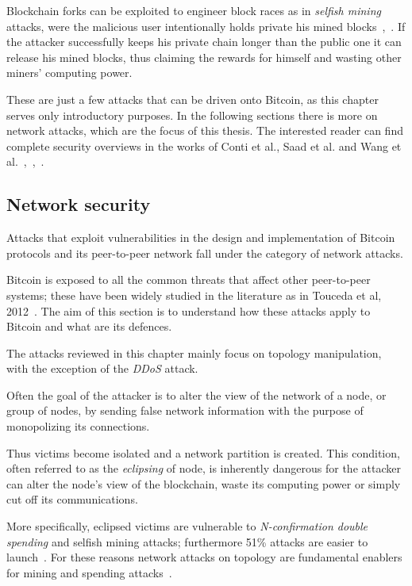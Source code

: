 \documentclass[12pt, letterpaper, twoside]{article}
\begin{document}
Blockchain forks can be exploited to engineer block races as in \textit{selfish mining} attacks, were the malicious user intentionally holds private his mined blocks~\cite{selfishmining},~\cite{leelavimolsilp2018selfish}. If the attacker successfully keeps his private chain longer than the public one it can release his mined blocks, thus claiming the rewards for himself and wasting other miners' computing power.

These are just a few attacks that can be driven onto Bitcoin, as this chapter serves only introductory purposes. In the following sections there is more on network attacks, which are the focus of this thesis. The interested reader can find complete security overviews in the works of Conti et al., Saad et al. and Wang et al.~\cite{completeattacksurvey},~\cite{saad2019attacksurface},~\cite{secpermissionlessblock}.

\subsection{Network security}\label{netsec}
Attacks that exploit vulnerabilities in the design and implementation of Bitcoin protocols and its peer-to-peer network fall under the category of network attacks.

Bitcoin is exposed to all the common threats that affect other peer-to-peer systems; these have been widely studied in the literature as in Touceda et al, 2012~\cite{toucedafakeboot}. The aim of this section is to understand how these attacks apply to Bitcoin and what are its defences.

The attacks reviewed in this chapter mainly focus on topology manipulation, with the exception of the \emph{DDoS} attack.

Often the goal of the attacker is to alter the view of the network of a node, or group of nodes, by sending false network information with the purpose of monopolizing its connections.

Thus victims become isolated and a network partition is created. This condition, often referred to as the \textit{eclipsing} of node, is inherently dangerous for the attacker can alter the node's view of the blockchain, waste its computing power or simply cut off its communications.

More specifically, eclipsed victims are vulnerable to \textit{N-confirmation double spending} and selfish mining attacks; furthermore 51\% attacks are easier to launch~\cite{eclipseatk}. For these reasons network attacks on topology are fundamental enablers for mining and spending attacks~\cite{dotan2020surveychallenges}.\\
\end{document}
